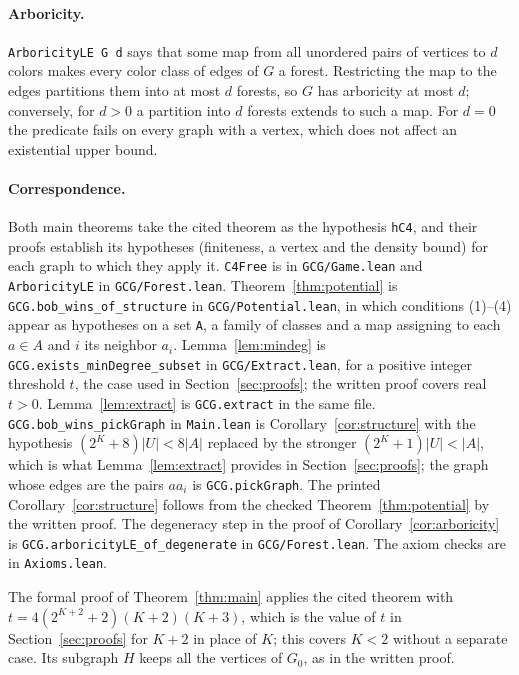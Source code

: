 \documentclass[11pt]{article}
\theoremstyle{remark}
\begin{document}
\begin{appendices}
\paragraph{Arboricity.} \texttt{ArboricityLE G d} says that some map from
all unordered pairs of vertices to $d$ colors makes every color class of
edges of $G$ a forest. Restricting the map to the edges partitions them
into at most $d$ forests, so $G$ has arboricity at most $d$; conversely,
for $d>0$ a partition into $d$ forests extends to such a map. For $d=0$
the predicate fails on every graph with a vertex, which does not affect an
existential upper bound.

\paragraph{Correspondence.}
Both main theorems take the cited theorem as the hypothesis \texttt{hC4},
and their proofs establish its hypotheses (finiteness, a vertex and the
density bound) for each graph to which they apply it.
\texttt{C4Free} is in \texttt{GCG/Game.lean} and \texttt{ArboricityLE} in
\texttt{GCG/Forest.lean}. Theorem~\ref{thm:potential} is
\texttt{GCG.bob\_wins\_of\_structure} in \texttt{GCG/Potential.lean}, in
which conditions (1)--(4) appear as hypotheses on a set \texttt{A}, a
family of classes and a map assigning to each $a\in A$ and $i$ its
neighbor $a_i$. Lemma~\ref{lem:mindeg} is
\texttt{GCG.exists\_minDegree\_subset} in \texttt{GCG/Extract.lean}, for a
positive integer threshold $t$, the case used in
Section~\ref{sec:proofs}; the written proof covers real $t>0$.
Lemma~\ref{lem:extract} is \texttt{GCG.extract} in the same file.
\texttt{GCG.bob\_wins\_pickGraph} in \texttt{Main.lean} is
Corollary~\ref{cor:structure} with the hypothesis $(2^K+8)|U|<8|A|$
replaced by the stronger $(2^K+1)|U|<|A|$, which is what
Lemma~\ref{lem:extract} provides in Section~\ref{sec:proofs}; the graph
whose edges are the pairs $aa_i$ is \texttt{GCG.pickGraph}. The printed
Corollary~\ref{cor:structure} follows from the checked
Theorem~\ref{thm:potential} by the written proof. The degeneracy step in
the proof of Corollary~\ref{cor:arboricity} is
\texttt{GCG.arboricityLE\_of\_degenerate} in \texttt{GCG/Forest.lean}.
The axiom checks are in \texttt{Axioms.lean}.

The formal proof of Theorem~\ref{thm:main} applies the cited theorem with
$t=4(2^{K+2}+2)(K+2)(K+3)$, which is the value of $t$ in
Section~\ref{sec:proofs} for $K+2$ in place of $K$; this covers $K<2$
without a separate case. Its subgraph $H$ keeps all the vertices of $G_0$,
as in the written proof.


\end{appendices}
\end{document}
